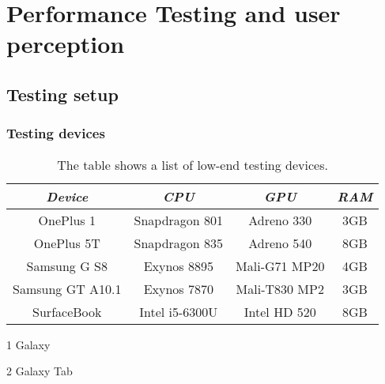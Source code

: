 \chapter{Performance Testing and user perception}
\label{cha:performance}

\section{Testing setup}

\subsection{Testing devices}

\begin{table}
  \centering
  \begin{threeparttable}
    \caption{The table shows a list of low-end testing devices.}
    \label{tab:lowendTestingDevices}
    \centering
    \def\rr{\rightskip=0pt plus1em \spaceskip=.3333em \xspaceskip=.5em\relax}
    \setlength{\tabcolsep}{1ex}
    \def\arraystretch{1.20}
    \setlength{\tabcolsep}{1ex}
    \small
    \begin{english}
      \begin{tabular}{|c||c|c|c|}
        \hline
          \multicolumn{1}{|c||}{\emph{Device}}&
          \multicolumn{1}{|c}{\emph{CPU}} &
          \multicolumn{1}{|c}{\emph{GPU}} &
          \multicolumn{1}{|c|}{\emph{RAM}} \\
        \hline
        \hline
        OnePlus 1 & 
        Snapdragon 801 & 
        Adreno 330 & 
        3GB \\
        \hline
        OnePlus 5T & 
        Snapdragon 835 & 
        Adreno 540  & 
        8GB \\
        \hline
        Samsung G\tnote{1} \hspace{0.1mm} S8 & 
        Exynos 8895 & 
        Mali-G71 MP20 & 
        4GB \\
        \hline
        Samsung GT\tnote{2} \hspace{0.1mm} A10.1 &
        Exynos 7870 & 
        Mali-T830 MP2 & 
        3GB \\
        \hline
        SurfaceBook & 
        Intel i5-6300U & 
        Intel HD 520 & 
        8GB \\
        \hline
      \end{tabular}  
    \end{english}
    \begin{tablenotes}
    \item [1] Galaxy
    \item [2] Galaxy Tab
    \end{tablenotes}
  \end{threeparttable}
\end{table}

